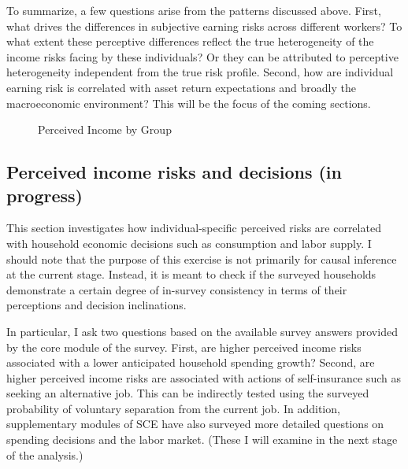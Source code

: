 \documentclass[12pt,notitlepage,onecolumn,aps,pra]{article}
\begin{document}
To summarize, a few questions arise from the patterns discussed above.
First, what drives the differences in subjective earning risks across
different workers? To what extent these perceptive differences reflect
the true heterogeneity of the income risks facing by these individuals?
Or they can be attributed to perceptive heterogeneity independent from
the true risk profile. Second, how are individual earning risk is
correlated with asset return expectations and broadly the macroeconomic
environment? This will be the focus of the coming sections.


    \begin{figure*}[!ht]
        \begin{center}\end{center}
        \caption{Perceived Income by Group}
        \label{fig:boxplotbygroup}
    \end{figure*}
    

    \begin{figure}[!ht]
        \begin{center}\end{center}
        \caption{}
        \label{}
    \end{figure}
    


    \hypertarget{perceived-income-risks-and-decisions-in-progress}{%
\subsection{Perceived income risks and decisions (in
progress)}\label{perceived-income-risks-and-decisions-in-progress}}

This section investigates how individual-specific perceived risks are
correlated with household economic decisions such as consumption and
labor supply. I should note that the purpose of this exercise is not
primarily for causal inference at the current stage. Instead, it is
meant to check if the surveyed households demonstrate a certain degree
of in-survey consistency in terms of their perceptions and decision
inclinations.

In particular, I ask two questions based on the available survey answers
provided by the core module of the survey. First, are higher perceived
income risks associated with a lower anticipated household spending
growth? Second, are higher perceived income risks are associated with
actions of self-insurance such as seeking an alternative job. This can
be indirectly tested using the surveyed probability of voluntary
separation from the current job. In addition, supplementary modules of
SCE have also surveyed more detailed questions on spending decisions and
the labor market. (These I will examine in the next stage of the
analysis.)
\end{document}
